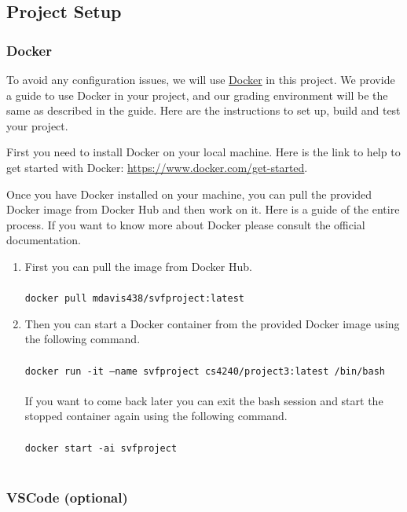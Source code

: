 \documentclass[12pt]{article}
\newcommand{\codeIn}[1]{{\small\tt{#1}}}
\begin{document}
\subsection{Project Setup}\label{sec:setup}

\subsubsection{Docker}
To avoid any configuration issues, we will use \href{https://www.docker.com/}{Docker} in this project. We provide a guide to use Docker in your project, and our grading environment will be the same as described in the guide. Here are the instructions to set up, build and test your project.

First you need to install Docker on your local machine. Here is the link to help to get started with Docker: \url{https://www.docker.com/get-started}.

Once you have Docker installed on your machine, you can pull the provided Docker image from Docker Hub and then work on it. Here is a guide of the entire process. If you want to know more about Docker please consult the official documentation.

\begin{enumerate}
    \item First you can pull the image from Docker Hub.\\\\
    \codeIn{docker pull mdavis438/svfproject:latest}\\
    \item Then you can start a Docker container from the provided Docker image using the following command.\\\\
    \codeIn{docker run -it --name svfproject cs4240/project3:latest /bin/bash}\\\\
    If you want to come back later you can exit the bash session and start the stopped container again using the following command.\\\\
    \codeIn{docker start -ai svfproject}\\\\
\end{enumerate}

\subsubsection{VSCode (optional)}
\end{document}

